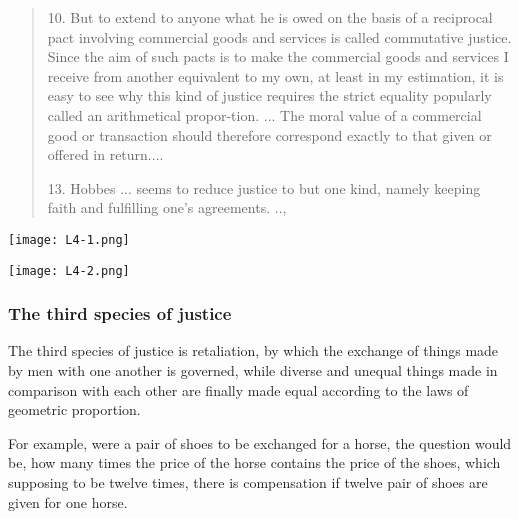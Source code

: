             \begin{quote}
                10. But to extend to anyone what he is owed on the basis of a reciprocal pact involving commercial goods and services is called commutative justice. Since the aim of such pacts is to make the commercial goods and services I receive from another equivalent to my own, at least in my estimation, it is easy to see why this kind of justice requires the strict equality popularly called an arithmetical propor-tion. ... The moral value of a commercial good or transaction should therefore correspond exactly to that given or offered in return....
                
                13. Hobbes ... seems to reduce justice to but one kind, namely keeping faith and fulfilling one's agreements. ..,
            \end{quote}

            \begin{minipage}{0.5\textwidth}
                \begin{center}
                    \texttt{[image: L4-1.png]}
                \end{center}
            \end{minipage}
            \begin{minipage}{0.5\textwidth}
                \begin{center}
                    \texttt{[image: L4-2.png]}
                \end{center}
            \end{minipage}

        \subsubsection{The third species of justice}

            The third species of justice is retaliation, by which the exchange of things made by men with one another is governed, while diverse and unequal things made in comparison with each other are finally made equal according to the laws of geometric proportion.

            \begin{example}
                For example, were a pair of shoes to be exchanged for a horse, the question would be, how many times the price of the horse contains the price of the shoes, which supposing to be twelve times, there is compensation if twelve pair of shoes are given for one horse.
            \end{example}

